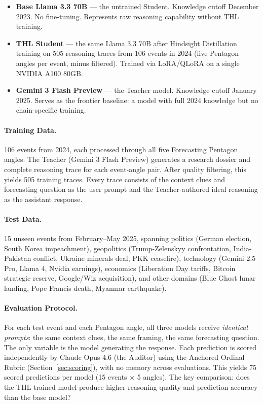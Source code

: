 \documentclass[11pt,a4paper]{article}
\begin{document}
\begin{itemize}
    \item \textbf{Base Llama 3.3 70B} --- the untrained Student. Knowledge cutoff December 2023. No fine-tuning. Represents raw reasoning capability without THL training.

    \item \textbf{THL Student} --- the same Llama 3.3 70B after Hindsight Distillation training on 505 reasoning traces from 106 events in 2024 (five Pentagon angles per event, minus filtered). Trained via LoRA/QLoRA on a single NVIDIA A100 80GB.

    \item \textbf{Gemini 3 Flash Preview} --- the Teacher model. Knowledge cutoff January 2025. Serves as the frontier baseline: a model with full 2024 knowledge but no chain-specific training.
\end{itemize}

\paragraph{Training Data.}
106 events from 2024, each processed through all five Forecasting Pentagon angles. The Teacher (Gemini 3 Flash Preview) generates a research dossier and complete reasoning trace for each event-angle pair. After quality filtering, this yields 505 training traces. Every trace consists of the context clues and forecasting question as the user prompt and the Teacher-authored ideal reasoning as the assistant response.

\paragraph{Test Data.}
15 unseen events from February--May 2025, spanning politics (German election, South Korea impeachment), geopolitics (Trump-Zelenskyy confrontation, India-Pakistan conflict, Ukraine minerals deal, PKK ceasefire), technology (Gemini 2.5 Pro, Llama 4, Nvidia earnings), economics (Liberation Day tariffs, Bitcoin strategic reserve, Google/Wiz acquisition), and other domains (Blue Ghost lunar landing, Pope Francis death, Myanmar earthquake).

\paragraph{Evaluation Protocol.}
For each test event and each Pentagon angle, all three models receive \emph{identical prompts}: the same context clues, the same framing, the same forecasting question. The only variable is the model generating the response. Each prediction is scored independently by Claude Opus 4.6 (the Auditor) using the Anchored Ordinal Rubric (Section~\ref{sec:scoring}), with no memory across evaluations. This yields 75 scored predictions per model (15 events $\times$ 5 angles). The key comparison: does the THL-trained model produce higher reasoning quality and prediction accuracy than the base model?
\end{document}
